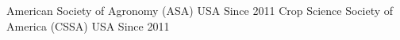 \begin{cvhonors}
  \cvhonor
    {}
    {American Society of Agronomy (ASA)}
    {USA}
    {Since 2011}
  \cvhonor
    {}
    {Crop Science Society of America (CSSA)}
    {USA}
    {Since 2011}
\end{cvhonors}
